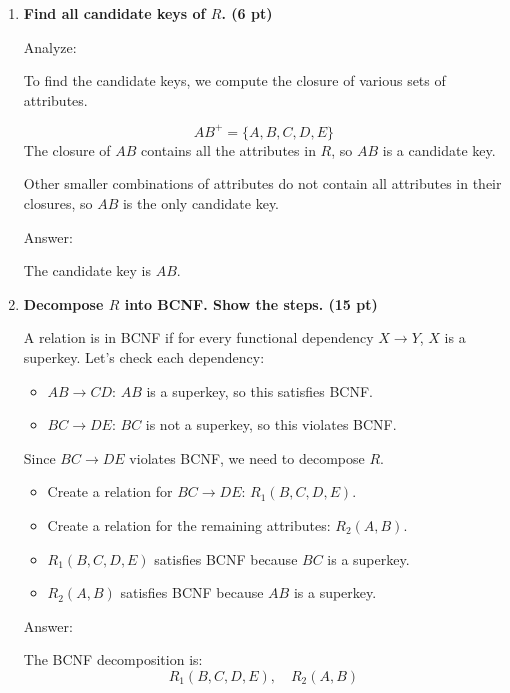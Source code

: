 \documentclass[12pt]{article}
\begin{document}
\begin{enumerate}
	\def\labelenumi{\alph{enumi})}
	
	\item \textbf{Find all candidate keys of \( R \). (6 pt)}
	
Analyze:

	To find the candidate keys, we compute the closure of various sets of attributes.
	

	\[
	AB^+ = \{ A, B, C, D, E \}
	\]
	The closure of \( AB \) contains all the attributes in \( R \), so \( AB \) is a candidate key.
	

	Other smaller combinations of attributes do not contain all attributes in their closures, so \( AB \) is the only candidate key.
	
Answer:

	The candidate key is \( AB \).
	
	\item \textbf{Decompose \( R \) into BCNF. Show the steps. (15 pt)}
	

	A relation is in BCNF if for every functional dependency \( X \rightarrow Y \), \( X \) is a superkey. Let's check each dependency:
	
	\begin{itemize}
		\item \( AB \rightarrow CD \): \( AB \) is a superkey, so this satisfies BCNF.
		\item \( BC \rightarrow DE \): \( BC \) is not a superkey, so this violates BCNF.
	\end{itemize}
	
	Since \( BC \rightarrow DE \) violates BCNF, we need to decompose \( R \).
	

	\begin{itemize}
		\item Create a relation for \( BC \rightarrow DE \): \( R_1(B, C, D, E) \).
		\item Create a relation for the remaining attributes: \( R_2(A, B) \).
	\end{itemize}
	

	\begin{itemize}
		\item \( R_1(B, C, D, E) \) satisfies BCNF because \( BC \) is a superkey.
		\item \( R_2(A, B) \) satisfies BCNF because \( AB \) is a superkey.
	\end{itemize}
	
Answer:

	 The BCNF decomposition is:
	\[
	R_1(B, C, D, E), \quad R_2(A, B)
	\]
	

\end{enumerate}
\end{document}
